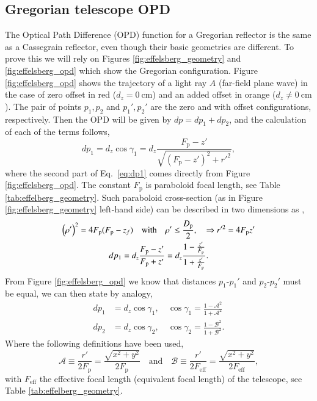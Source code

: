 \documentclass[
    ]
    {aa}
\begin{document}
\begin{appendix}
        \section{Gregorian telescope OPD}
        \label{ap:gregorian_telescope_opd}
        The Optical Path Difference (OPD) function for a Gregorian reflector is the same as a Cassegrain reflector, even though their basic geometries are different. 
        To prove this we will rely on Figures \ref{fig:effelsberg_geometry} and \ref{fig:effelsberg_opd} which show the Gregorian configuration. Figure \ref{fig:effelsberg_opd} shows the trajectory of a light ray $A$ (far-field plane wave) in the case of zero offset in red ($d_z=\SI{0}{\cm}$) and an added offset in orange ($d_z\neq\SI{0}{\cm}$). The pair of points $p_1, p_2$ and $p_1', p_2'$ are the zero and with offset configurations, respectively. Then the OPD will be given by $dp=dp_1 + dp_2$, and the calculation of each of the terms follows,
        \begin{equation}
            dp_1=d_z\cos\gamma_1=d_z\frac{F_\text{p}-z'}{\sqrt{(F_\text{p}-z')^2+r'^2}}, \label{eq:dp1}
        \end{equation}
        where the second part of Eq.~\eqref{eq:dp1} comes directly from Figure \ref{fig:effelsberg_opd}. The constant $F_\text{p}$ is paraboloid focal length, see Table \ref{tab:effelberg_geometry}. Such paraboloid cross-section (as in Figure \ref{fig:effelsberg_geometry} left-hand side) can be described in two dimensions as \citep[see][Chapter~7]{stutzman1998antenna},
        \begin{gather}
            \del{\rho'}^2=4F_\text{p}(F_\text{p}-z_f) \quad\text{with}\quad \rho' \leq \frac{D_\text{p}}{2}, \quad\Rightarrow r'^2 = 4 F_\text{p}z' \label{eq:paraboloid} \\ dp_1=d_z\frac{F_\text{p}-z'}{F_\text{p}+z'}=d_z\frac{1-\frac{z'}{F_\text{p}}}{1+\frac{z'}{F_\text{p}}}.
        \end{gather}
        From Figure \ref{fig:effelsberg_opd} we know that distances $p_1$-$p_1'$ and $p_2$-$p_2'$ must be equal, we can then state by analogy,
        \begin{align}
            dp_1 & = d_z\cos\gamma_1, \quad \cos\gamma_1=\frac{1-\mathcal{A}^2}{1+\mathcal{A}^2} \label{eq:defa}\\
            dp_2 & = d_z\cos\gamma_2, \quad \cos\gamma_2=\frac{1-\mathcal{B}^2}{1+\mathcal{B}^2} \label{eq:defb}.
        \end{align}
        Where the following definitions have been used,
        \begin{equation}
        \mathcal{A}\equiv\frac{r'}{2F_\text{p}}=\frac{\sqrt{x^2+y^2}}{2F_\text{p}}\quad\text{and}\quad \mathcal{B}\equiv\frac{r'}{2 F_\text{eff}}=\frac{\sqrt{x^2+y^2}}{2F_\text{eff}},
        \end{equation}
        with $F_\text{eff}$ the effective focal length (equivalent focal length) of the telescope, see Table \ref{tab:effelberg_geometry}.


\end{appendix}
\end{document}
